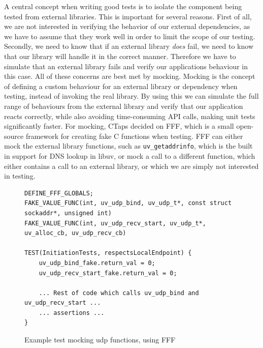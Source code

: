 A central concept when writing good tests is to isolate the component being tested from
external libraries. This is important for several reasons. First of all, we are not interested
in verifying the behavior of our external dependencies, as we have to assume that they
work well in order to limit the scope of our testing. Secondly, we need to know that if
an external library \textit{does} fail, we need to know that our library will handle it
in the correct manner. Therefore we have to simulate that an external library fails and
verify our applications behaviour in this case. All of these concerns are best met by
mocking. Mocking is the concept of defining a custom behaviour for an external library
or dependency when testing, instead of invoking the real library. By using this we can
simulate the full range of behaviours from the external library and verify that our application
reacts correctly, while also avoiding time-consuming API calls, making unit tests
significantly faster. For mocking, CTaps decided on FFF, which is a small open-source
framework for creating fake C functions when testing. \cite{longFakeFunctionFramework2025}
FFF can either mock the external library functions, such as \texttt{uv\_getaddrinfo},
which is the built in support for DNS lookup in libuv, or mock a call to a different
function, which either contains a call to an external library, or which we are simply
not interested in testing.

\begin{figure}
\begin{verbatim}
DEFINE_FFF_GLOBALS;
FAKE_VALUE_FUNC(int, uv_udp_bind, uv_udp_t*, const struct sockaddr*, unsigned int)
FAKE_VALUE_FUNC(int, uv_udp_recv_start, uv_udp_t*, uv_alloc_cb, uv_udp_recv_cb)

TEST(InitiationTests, respectsLocalEndpoint) {
    uv_udp_bind_fake.return_val = 0;
    uv_udp_recv_start_fake.return_val = 0;
    
    ... Rest of code which calls uv_udp_bind and uv_udp_recv_start ...
    ... assertions ...
}

\end{verbatim}
\caption{Example test mocking udp functions, using FFF}
\end{figure}

